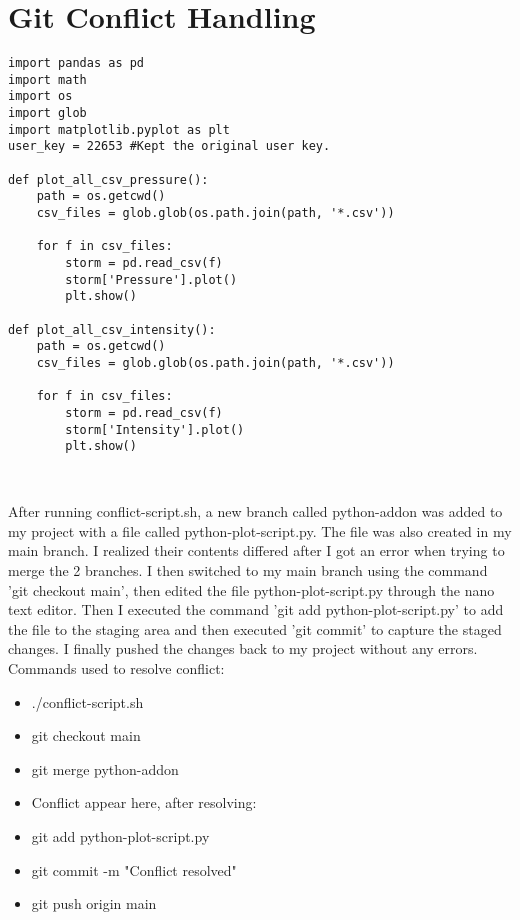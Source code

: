 \documentclass[]{article}
\begin{document}
\section{Git Conflict Handling}
\begin{lstlisting}[style=scriptstyle]
import pandas as pd
import math
import os
import glob
import matplotlib.pyplot as plt
user_key = 22653 #Kept the original user key.

def plot_all_csv_pressure():
    path = os.getcwd()
    csv_files = glob.glob(os.path.join(path, '*.csv'))

    for f in csv_files:
        storm = pd.read_csv(f)
        storm['Pressure'].plot()
        plt.show()

def plot_all_csv_intensity():
    path = os.getcwd()
    csv_files = glob.glob(os.path.join(path, '*.csv'))

    for f in csv_files:
        storm = pd.read_csv(f)
        storm['Intensity'].plot()
        plt.show()



\end{lstlisting}
After running conflict-script.sh, a new branch called python-addon was added to my project with a file called python-plot-script.py.
The file was also created in my main branch. I realized their contents differed after I got an error when trying to merge the 2 branches.
I then switched to my main branch using the command 'git checkout main', then edited the file python-plot-script.py through the nano text editor.
Then I executed the command 'git add python-plot-script.py' to add the file to the staging area and then executed 'git commit' to capture the staged changes.
I finally pushed the changes back to my project without any errors.
Commands used to resolve conflict:
\begin{itemize}
    \item ./conflict-script.sh
    \item git checkout main
    \item git merge python-addon
    \item Conflict appear here, after resolving:
    \item git add python-plot-script.py
    \item git commit -m "Conflict resolved"
    \item git push origin main
\end{itemize}
\end{document}
